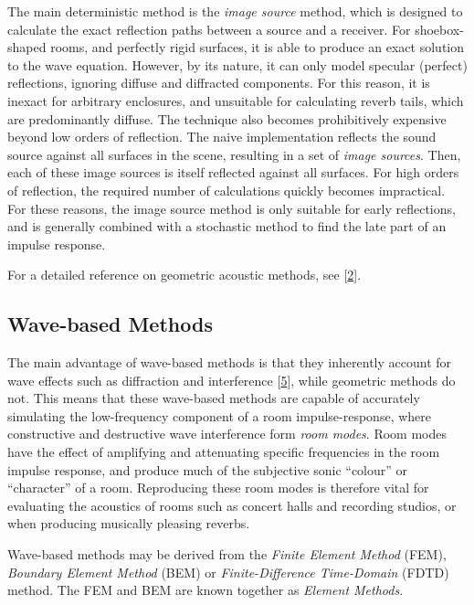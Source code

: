 \documentclass[]{scrreprt}
\begin{document}
The main deterministic method is the \emph{image source} method, which
is designed to calculate the exact reflection paths between a source and
a receiver. For shoebox-shaped rooms, and perfectly rigid surfaces, it
is able to produce an exact solution to the wave equation. However, by
its nature, it can only model specular (perfect) reflections, ignoring
diffuse and diffracted components. For this reason, it is inexact for
arbitrary enclosures, and unsuitable for calculating reverb tails, which
are predominantly diffuse. The technique also becomes prohibitively
expensive beyond low orders of reflection. The naive implementation
reflects the sound source against all surfaces in the scene, resulting
in a set of \emph{image sources}. Then, each of these image sources is
itself reflected against all surfaces. For high orders of reflection,
the required number of calculations quickly becomes impractical. For
these reasons, the image source method is only suitable for early
reflections, and is generally combined with a stochastic method to find
the late part of an impulse response.

For a detailed reference on geometric acoustic methods, see
{[}\protect\hyperlink{ref-saviojaux5foverviewux5f2015}{2}{]}.

\subsection{Wave-based Methods}\label{wave-based-methods}

The main advantage of wave-based methods is that they inherently account
for wave effects such as diffraction and interference
{[}\protect\hyperlink{ref-shelleyux5fdiffuseux5f2007}{5}{]}, while
geometric methods do not. This means that these wave-based methods are
capable of accurately simulating the low-frequency component of a room
impulse-response, where constructive and destructive wave interference
form \emph{room modes}. Room modes have the effect of amplifying and
attenuating specific frequencies in the room impulse response, and
produce much of the subjective sonic ``colour'' or ``character'' of a
room. Reproducing these room modes is therefore vital for evaluating the
acoustics of rooms such as concert halls and recording studios, or when
producing musically pleasing reverbs.

Wave-based methods may be derived from the \emph{Finite Element Method}
(FEM), \emph{Boundary Element Method} (BEM) or \emph{Finite-Difference
Time-Domain} (FDTD) method. The FEM and BEM are known together as
\emph{Element Methods}.
\end{document}
